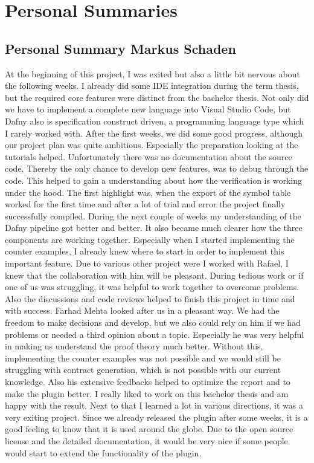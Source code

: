 \section{Personal Summaries}

\subsection{Personal Summary Markus Schaden}
At the beginning of this project, I was exited but also a little bit nervous about the following weeks. I already did some IDE integration during the term thesis, but the required core features were distinct from the bachelor thesis. Not only did we have to implement a complete new language into Visual Studio Code, but Dafny also is specification construct driven, a programming language type which I rarely worked with. \newline
After the first weeks, we did some good progress, although our project plan was quite ambitious. Especially the preparation looking at the tutorials helped. Unfortunately there was no documentation about the source code. Thereby the only chance to develop new features, was to debug through the code. This helped to gain a understanding about how the verification is working under the hood. The first highlight was, when the export of the symbol table worked for the first time and after a lot of trial and error the project finally successfully compiled.  \newline
During the next couple of weeks my understanding of the Dafny pipeline got better and better. It also became much clearer how the three components are working together. Especially when I started implementing the counter examples, I already knew where to start in order to implement this important feature.  \newline
Due to various other project were I worked with Rafael, I knew that the collaboration with him will be pleasant. During tedious work or if one of us was struggling, it was helpful to work together to overcome problems. Also the discussions and code reviews helped to finish this project in time and with success.   \newline
Farhad Mehta looked after us in a pleasant way. We had the freedom to make decisions and develop, but we also could rely on him if we had problems or needed a third opinion about a topic. Especially he was very helpful in making us understand the proof theory much better. Without this, implementing the counter examples was not possible and we would still be struggling with contract generation, which is not possible with our current knowledge. Also his extensive feedbacks helped to optimize the report and to make the plugin better.  \newline
I really liked to work on this bachelor thesis and am happy with the result. Next to that I learned a lot in various directions, it was a very exiting project. Since we already released the plugin after some weeks, it is a good feeling to know that it is used around the globe. Due to the open source license and the detailed documentation, it would be very nice if some people would start to extend the functionality of the plugin.   \newline
